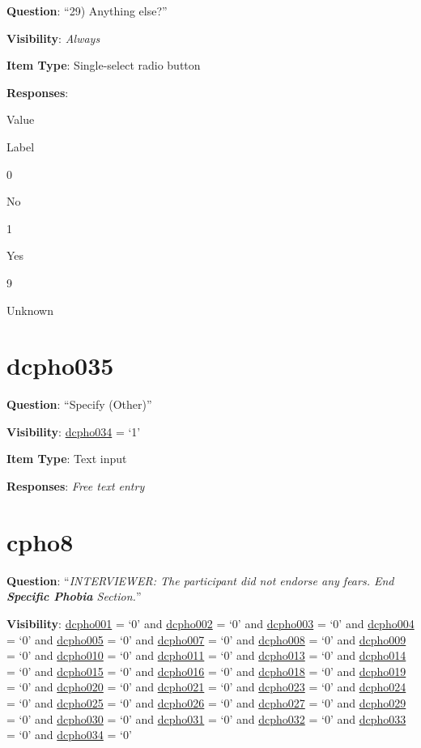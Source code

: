 \documentclass[]{book}
\begin{document}
\textbf{Question}: ``29) Anything else?''

\textbf{Visibility}: \emph{Always}

\textbf{Item Type}: Single-select radio button

\textbf{Responses}:

Value

Label

0

No

1

Yes

9

Unknown

\hypertarget{dcpho035}{%
\section{dcpho035}\label{dcpho035}}

\textbf{Question}: ``Specify (Other)''

\textbf{Visibility}: \protect\hyperlink{dcpho034}{dcpho034} = `1'

\textbf{Item Type}: Text input

\textbf{Responses}: \emph{Free text entry}

\hypertarget{cpho8}{%
\section{cpho8}\label{cpho8}}

\textbf{Question}: ``\emph{INTERVIEWER: The participant did not endorse any fears. End \textbf{Specific Phobia} Section.}''

\textbf{Visibility}: \protect\hyperlink{dcpho001}{dcpho001} = `0' and \protect\hyperlink{dcpho002}{dcpho002} = `0' and \protect\hyperlink{dcpho003}{dcpho003} = `0' and \protect\hyperlink{dcpho004}{dcpho004} = `0' and \protect\hyperlink{dcpho005}{dcpho005} = `0' and \protect\hyperlink{dcpho007}{dcpho007} = `0' and \protect\hyperlink{dcpho008}{dcpho008} = `0' and \protect\hyperlink{dcpho009}{dcpho009} = `0' and \protect\hyperlink{dcpho010}{dcpho010} = `0' and \protect\hyperlink{dcpho011}{dcpho011} = `0' and \protect\hyperlink{dcpho013}{dcpho013} = `0' and \protect\hyperlink{dcpho014}{dcpho014} = `0' and \protect\hyperlink{dcpho015}{dcpho015} = `0' and \protect\hyperlink{dcpho016}{dcpho016} = `0' and \protect\hyperlink{dcpho018}{dcpho018} = `0' and \protect\hyperlink{dcpho019}{dcpho019} = `0' and \protect\hyperlink{dcpho020}{dcpho020} = `0' and \protect\hyperlink{dcpho021}{dcpho021} = `0' and \protect\hyperlink{dcpho023}{dcpho023} = `0' and \protect\hyperlink{dcpho024}{dcpho024} = `0' and \protect\hyperlink{dcpho025}{dcpho025} = `0' and \protect\hyperlink{dcpho026}{dcpho026} = `0' and \protect\hyperlink{dcpho027}{dcpho027} = `0' and \protect\hyperlink{dcpho029}{dcpho029} = `0' and \protect\hyperlink{dcpho030}{dcpho030} = `0' and \protect\hyperlink{dcpho031}{dcpho031} = `0' and \protect\hyperlink{dcpho032}{dcpho032} = `0' and \protect\hyperlink{dcpho033}{dcpho033} = `0' and \protect\hyperlink{dcpho034}{dcpho034} = `0'
\end{document}
